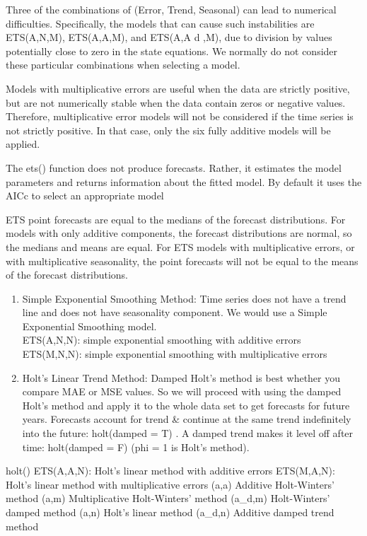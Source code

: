 \documentclass[]{book}
\theoremstyle{definition}
\theoremstyle{definition}
\theoremstyle{definition}
\theoremstyle{remark}
\begin{document}
Three of the combinations of (Error, Trend, Seasonal) can lead to
numerical difficulties. Specifically, the models that can cause such
instabilities are ETS(A,N,M), ETS(A,A,M), and ETS(A,A d ,M), due to
division by values potentially close to zero in the state equations. We
normally do not consider these particular combinations when selecting a
model.

Models with multiplicative errors are useful when the data are strictly
positive, but are not numerically stable when the data contain zeros or
negative values. Therefore, multiplicative error models will not be
considered if the time series is not strictly positive. In that case,
only the six fully additive models will be applied.

The ets() function does not produce forecasts. Rather, it estimates the
model parameters and returns information about the fitted model. By
default it uses the AICc to select an appropriate model

ETS point forecasts are equal to the medians of the forecast
distributions. For models with only additive components, the forecast
distributions are normal, so the medians and means are equal. For ETS
models with multiplicative errors, or with multiplicative seasonality,
the point forecasts will not be equal to the means of the forecast
distributions.

\begin{enumerate}
\def\labelenumi{\arabic{enumi}.}
\item
  Simple Exponential Smoothing Method: Time series does not have a trend
  line and does not have seasonality component. We would use a Simple
  Exponential Smoothing model.\\
  ETS(A,N,N): simple exponential smoothing with additive errors
  \textbar{} ETS(M,N,N): simple exponential smoothing with
  multiplicative errors
\item
  Holt's Linear Trend Method: Damped Holt's method is best whether you
  compare MAE or MSE values. So we will proceed with using the damped
  Holt's method and apply it to the whole data set to get forecasts for
  future years. Forecasts account for trend \& continue at the same
  trend indefinitely into the future: holt(damped = T) . A damped trend
  makes it level off after time: holt(damped = F) (phi = 1 is Holt's
  method).
\end{enumerate}

holt() \textbar{} ETS(A,A,N): Holt's linear method with additive errors
\textbar{} ETS(M,A,N): Holt's linear method with multiplicative errors
\textbar{} (a,a) Additive Holt-Winters' method \textbar{} (a,m)
Multiplicative Holt-Winters' method \textbar{} (a\_d,m) Holt-Winters'
damped method \textbar{} (a,n) Holt's linear method \textbar{} (a\_d,n)
Additive damped trend method
\end{document}

